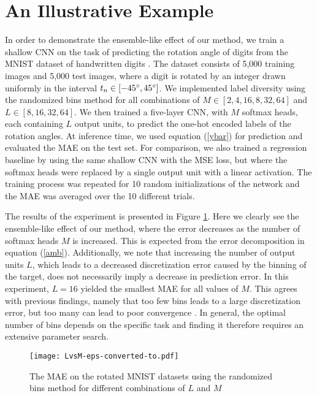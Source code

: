 \documentclass[10pt, conference, a4paper]{IEEEtran}
\begin{document}
\section{An Illustrative Example}
In order to demonstrate the ensemble-like effect of our method, we train a shallow CNN on the task of predicting the rotation angle of digits from the MNIST dataset of handwritten digits \cite{lecun1998mnist}. The dataset consists of 5,000 training images and 5,000 test images, where a digit is rotated by an integer drawn uniformly in the interval $t_n \in [-45 \degree, 45 \degree]$. We implemented label diversity using the randomized bins method for all combinations of $M \in [2, 4, 16, 8, 32, 64]$ and $L \in [8, 16, 32, 64]$. We then trained a five-layer CNN, with $M$ softmax heads, each containing $L$ output units, to predict the one-hot encoded labels of the rotation angles. At inference time, we used equation (\ref{ybar}) for prediction and evaluated the MAE on the test set. For comparison, we also trained a regression baseline by using the same shallow CNN with the MSE loss, but where the softmax heads were replaced by a single output unit with a linear activation. The training process was repeated for 10 random initializations of the network and the MAE was averaged over the 10 different trials.

The results of the experiment is presented in Figure \ref{LvsM}. Here we clearly see the ensemble-like effect of our method, where the error decreases as the number of softmax heads $M$ is increased. This is expected from the error decomposition in equation (\ref{amb}). Additionally, we note that increasing the number of output units $L$, which leads to a decreased discretization error caused by the binning of the target, does not necessarily imply a decrease in prediction error. In this experiment, $L = 16$ yielded the smallest MAE for all values of $M$. This agrees with previous findings, namely that too few bins leads to a large discretization error, but too many can lead to poor convergence \cite{diaz2019soft, fu2018deep}. In general, the optimal number of bins depends on the specific task and finding it therefore requires an extensive parameter search.

\begin{figure}[t]
  \centering
  \texttt{[image: LvsM-eps-converted-to.pdf]}
  \caption{The MAE on the rotated MNIST datasets using the randomized bins method for different combinations of $L$ and $M$}
\label{LvsM}
\end{figure}
\end{document}
